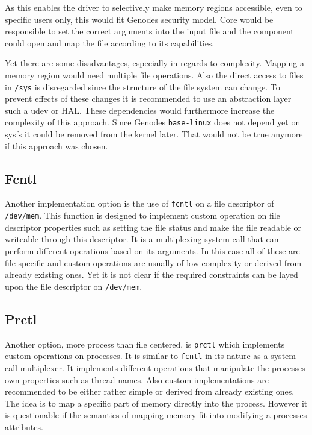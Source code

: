 \documentclass[
a4paper,
12pt,
notitlepage,
parskip=half,
DIV=11,
]{scrbook}
\begin{document}
		As this enables the driver to selectively make memory regions accessible, even to specific users only, this would fit Genodes security model.
		Core would be responsible to set the correct arguments into the input file and the component could open and map the file according to its capabilities.
		
		Yet there are some disadvantages, especially in regards to complexity.
		Mapping a memory region would need multiple file operations.
		Also the direct access to files in \texttt{/sys} is disregarded since the structure of the file system can change.
		To prevent effects of these changes it is recommended to use an abstraction layer such a udev or HAL.
		These dependencies would furthermore increase the complexity of this approach.
		Since Genodes \texttt{base-linux} does not depend yet on sysfs it could be removed from the kernel later.
		That would not be true anymore if this approach was chosen. \citep{sysfs}
		
		\subsection{Fcntl}
		
		Another implementation option is the use of \texttt{fcntl} on a file descriptor of \texttt{/dev/mem}.
		This function is designed to implement custom operation on file descriptor properties such as setting the file status and make the file readable or writeable through this descriptor.
		It is a multiplexing system call that can perform different operations based on its arguments.
		In this case all of these are file specific and custom operations are usually of low complexity or derived from already existing ones.
		Yet it is not clear if the required constraints can be layed upon the file descriptor on \texttt{/dev/mem}. \citep{syscall} \citep{fcntl}
		
		\subsection{Prctl}
		
		Another option, more process than file centered, is \texttt{prctl} which implements custom operations on processes.
		It is similar to \texttt{fcntl} in its nature as a system call multiplexer.
		It implements different operations that manipulate the processes own properties such as thread names.
		Also custom implementations are recommended to be either rather simple or derived from already existing ones.
		The idea is to map a specific part of memory directly into the process.
		However it is questionable if the semantics of mapping memory fit into modifying a processes attributes. \citep{syscall} \citep{prctl}
		
\end{document}
